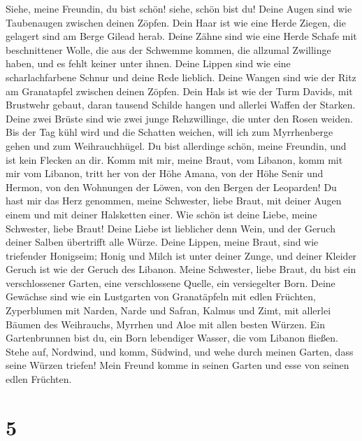  Siehe, meine Freundin, du bist schön! siehe, schön bist
du! Deine Augen sind wie Taubenaugen zwischen deinen Zöpfen. Dein Haar
ist wie eine Herde Ziegen, die gelagert sind am Berge Gilead herab.
 Deine Zähne sind wie eine Herde Schafe mit beschnittener
Wolle, die aus der Schwemme kommen, die allzumal Zwillinge haben, und es
fehlt keiner unter ihnen.  Deine Lippen sind wie eine
scharlachfarbene Schnur und deine Rede lieblich. Deine Wangen sind wie
der Ritz am Granatapfel zwischen deinen Zöpfen.  Dein Hals
ist wie der Turm Davids, mit Brustwehr gebaut, daran tausend Schilde
hangen und allerlei Waffen der Starken.  Deine zwei Brüste
sind wie zwei junge Rehzwillinge, die unter den Rosen weiden.
 Bis der Tag kühl wird und die Schatten weichen, will ich
zum Myrrhenberge gehen und zum Weihrauchhügel.  Du bist
allerdinge schön, meine Freundin, und ist kein Flecken an dir.
 Komm mit mir, meine Braut, vom Libanon, komm mit mir vom
Libanon, tritt her von der Höhe Amana, von der Höhe Senir und Hermon,
von den Wohnungen der Löwen, von den Bergen der Leoparden!
 Du hast mir das Herz genommen, meine Schwester, liebe
Braut, mit deiner Augen einem und mit deiner Halsketten einer.
 Wie schön ist deine Liebe, meine Schwester, liebe Braut!
Deine Liebe ist lieblicher denn Wein, und der Geruch deiner Salben
übertrifft alle Würze.  Deine Lippen, meine Braut, sind
wie triefender Honigseim; Honig und Milch ist unter deiner Zunge, und
deiner Kleider Geruch ist wie der Geruch des Libanon. 
Meine Schwester, liebe Braut, du bist ein verschlossener Garten, eine
verschlossene Quelle, ein versiegelter Born.  Deine
Gewächse sind wie ein Lustgarten von Granatäpfeln mit edlen Früchten,
Zyperblumen mit Narden,  Narde und Safran, Kalmus und
Zimt, mit allerlei Bäumen des Weihrauchs, Myrrhen und Aloe mit allen
besten Würzen.  Ein Gartenbrunnen bist du, ein Born
lebendiger Wasser, die vom Libanon fließen.  Stehe auf,
Nordwind, und komm, Südwind, und wehe durch meinen Garten, dass seine
Würzen triefen! Mein Freund komme in seinen Garten und esse von seinen
edlen Früchten.

\hypertarget{section-4}{%
\section{5}\label{section-4}}

